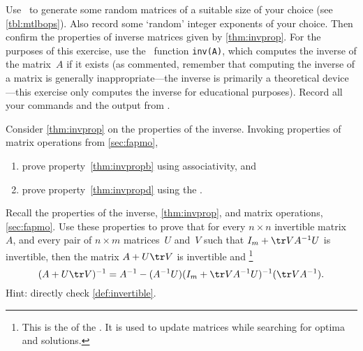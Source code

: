 \begin{exercise}  
Use \script\ to generate some random matrices of a suitable size of your choice (see \cref{tbl:mtlbops}). 
Also record some `random' integer exponents of your choice.
Then confirm the properties of inverse matrices given by \cref{thm:invprop}.
For the purposes of this exercise, use the \script\ function \verb|inv(A)|, which computes the inverse of the matrix~\(A\) if it exists (as commented, remember that computing the inverse of a matrix is generally inappropriate---the inverse is primarily a  theoretical device---this exercise only computes the inverse for educational purposes).
Record all your commands and the output from \script.
\end{exercise}







\begin{exercise}  
Consider \cref{thm:invprop} on the properties of the inverse. Invoking properties of matrix operations from \cref{sec:fapmo},
\begin{enumerate}
\item prove property~\ref{thm:invpropb} using associativity, and
\item prove property~\ref{thm:invpropd} using the .
\end{enumerate}
\end{exercise}



\begin{exercise}  
Recall the properties of the inverse, \cref{thm:invprop}, and matrix operations, \cref{sec:fapmo}.
Use these properties to prove that for every \(n\times n\) invertible matrix~\(A\), and every pair of \(n\times m\) matrices~\(U\) and~\(V\) such that \(I_m+\tr VA^{-1}U\) is invertible, then the matrix \(A+U\tr V\) is invertible and%
\footnote{This is the  of the .  
It is used to update matrices while searching for optima and solutions.}
\begin{equation*}
(A+U\tr V)^{-1}=A^{-1}-(A^{-1}U)(I_m+\tr VA^{-1}U)^{-1}(\tr VA^{-1}).
\end{equation*}
Hint: directly check \cref{def:invertible}.
\end{exercise}





